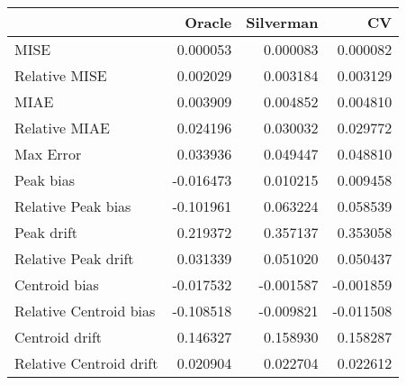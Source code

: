 \begin{tabular}{lrrr}
  \hline
 & Oracle & Silverman & CV \\ 
  \hline
MISE & 0.000053 & 0.000083 & 0.000082 \\ 
  Relative MISE & 0.002029 & 0.003184 & 0.003129 \\ 
  MIAE & 0.003909 & 0.004852 & 0.004810 \\ 
  Relative MIAE & 0.024196 & 0.030032 & 0.029772 \\ 
  Max Error & 0.033936 & 0.049447 & 0.048810 \\ 
  Peak bias & -0.016473 & 0.010215 & 0.009458 \\ 
  Relative Peak bias & -0.101961 & 0.063224 & 0.058539 \\ 
  Peak drift & 0.219372 & 0.357137 & 0.353058 \\ 
  Relative Peak drift & 0.031339 & 0.051020 & 0.050437 \\ 
  Centroid bias & -0.017532 & -0.001587 & -0.001859 \\ 
  Relative Centroid bias & -0.108518 & -0.009821 & -0.011508 \\ 
  Centroid drift & 0.146327 & 0.158930 & 0.158287 \\ 
  Relative Centroid drift & 0.020904 & 0.022704 & 0.022612 \\ 
   \hline
\end{tabular}

